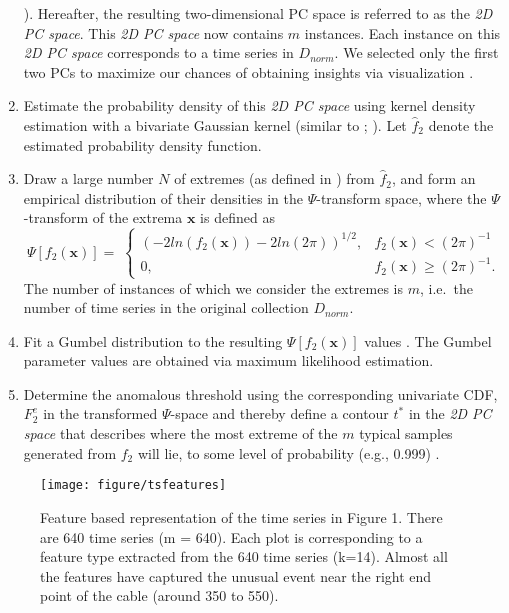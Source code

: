 \documentclass[12pt]{article}
\begin{document}
\begin{enumerate}
  \citet{kang2017visualising}). Hereafter, the resulting two-dimensional
  PC space is referred to as the \emph{2D PC space}. This \emph{2D PC
  space} now contains \(m\) instances. Each instance on this \emph{2D PC
  space} corresponds to a time series in \(D_{norm}\). We selected only
  the first two PCs to maximize our chances of obtaining insights via
  visualization \citep{kang2017visualising}.
\item
  Estimate the probability density of this \emph{2D PC space} using
  kernel density estimation with a bivariate Gaussian kernel (similar to
  \citet{luca2014detecting}; \citet{cuppens2014accelerometry}). Let
  \(\hat{f}_{2}\) denote the estimated probability density function.
\item
  Draw a large number \(N\) of extremes (as defined in
  \citet{clifton2011novelty}) from \(\hat{f}_{2}\), and form an
  empirical distribution of their densities in the \(\Psi\)-transform
  space, where the \(\Psi\)-transform of the extrema \(\mathbf{x}\) is
  defined as \[
    \Psi[{f_{2}}(\mathbf{x})]=\;
       \begin{cases}
       (-2ln({f_{2}}(\mathbf{x}))-2ln(2\pi))^{1/2},& {f_{2}}(\mathbf{x}) < (2\pi)^{-1}\\
       0,              & {f_{2}}(\mathbf{x}) \ge (2\pi)^{-1}.
       \end{cases}
  \] The number of instances of which we consider the extremes is \(m\),
  i.e.~the number of time series in the original collection
  \(D_{norm}.\)
\item
  Fit a Gumbel distribution to the resulting
  \(\Psi[{f_{2}}(\mathbf{x})]\) values
  \citep{clifton2011novelty, hugueny2013novelty}. The Gumbel parameter
  values are obtained via maximum likelihood estimation.
\item
  Determine the anomalous threshold using the corresponding univariate
  CDF, \(F_{2}^{e}\) in the transformed \(\Psi\)-space and thereby
  define a contour \(t^{*}\) in the \emph{2D PC space} that describes
  where the most extreme of the \(m\) typical samples generated from
  \(f_{2}\) will lie, to some level of probability (e.g., 0.999)
  \citep{farrar2012structural}.
\end{enumerate}

\begin{figure}[ht]

{\centering \texttt{[image: figure/tsfeatures]} 

}

\caption{Feature based representation of the time series in Figure 1. There are 640 time series (m = 640). Each plot is corresponding to a feature type extracted from the 640 time series (k=14). Almost all the features have captured the unusual event near the right end point of the cable (around 350 to 550).}\label{fig:tsfeatures}
\end{figure}
\end{document}
